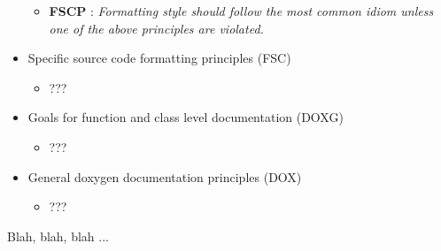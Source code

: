 \begin{itemize}
\begin{itemize}
  {}\item{}\textbf{FSCP
  {}}: {}\textit{Formatting style should follow the
  most common idiom unless one of the above principles are violated.}

  \end{itemize}

\item Specific source code formatting principles (FSC)

  \begin{itemize}

  \item ???

  \end{itemize}

\item Goals for function and class level documentation (DOXG)

  \begin{itemize}

  \item ???

  \end{itemize}

\item General doxygen documentation principles (DOX)

  \begin{itemize}

  \item ???

  \end{itemize}

\end{itemize}


Blah, blah, blah ...
